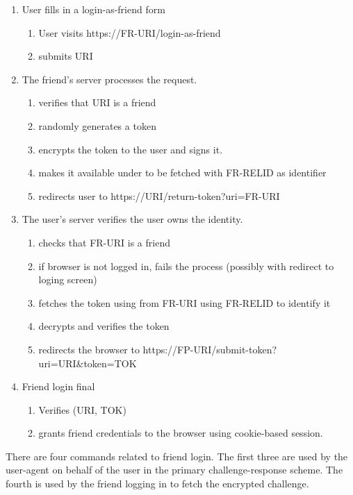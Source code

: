 \documentclass[letterpaper,11pt,oneside]{article}
\begin{document}
\begin{enumerate}
\item User fills in a login-as-friend form
	\begin{enumerate}
	\item User visits https://FR-URI/login-as-friend
	\item submits URI
	\end{enumerate}

\item The friend's server processes the request.
	\begin{enumerate}
	\item verifies that URI is a friend
	\item randomly generates a token
	\item encrypts the token to the user and signs it.
	\item makes it available under to be fetched with FR-RELID as identifier
	\item redirects user to https://URI/return-token?uri=FR-URI
	\end{enumerate}

\item  The user's server verifies the user owns the identity.
	\begin{enumerate}
	\item checks that FR-URI is a friend
	\item if browser is not logged in, fails the process (possibly with redirect to loging screen)
	\item fetches the token using from FR-URI using FR-RELID to identify it
	\item decrypts and verifies the token
	\item redirects the browser to https://FP-URI/submit-token?uri=URI\&token=TOK
	\end{enumerate}

\item Friend login final
	\begin{enumerate}
	\item Verifies (URI, TOK)
	\item grants friend credentials to the browser using cookie-based session.
	\end{enumerate}
\end{enumerate}

There are four commands related to friend login. The first three are used by
the user-agent on behalf of the user in the primary challenge-response scheme.
The fourth is used by the friend logging in to fetch the encrypted challenge.
\end{document}
